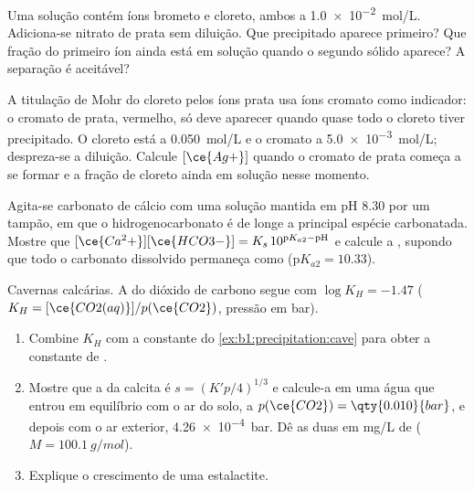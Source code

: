 \begin{exercise}[$\star\star$]\label{exo:b1:precipitation:7}
Uma solução contém íons brometo e cloreto, ambos a
\qty{1.0e-2}{mol/L}. Adiciona-se nitrato de prata sem diluição. Que
precipitado aparece primeiro? Que fração do primeiro íon ainda está em
solução quando o segundo sólido aparece? A separação é aceitável?
\end{exercise}

\begin{exercise}[$\star\star$]\label{exo:b1:precipitation:8}
A titulação de Mohr do cloreto pelos íons prata usa íons cromato como
indicador: o cromato de prata, vermelho, só deve aparecer quando quase
todo o cloreto tiver precipitado. O cloreto está a \qty{0.050}{mol/L} e
o cromato a \qty{5.0e-3}{mol/L}; despreza-se a diluição. Calcule
$[\ce{Ag+}]$ quando o cromato de prata começa a se formar e a fração de
cloreto ainda em solução nesse momento.
\end{exercise}

\begin{exercise}[$\star\star$]\label{exo:b1:precipitation:9}
Agita-se carbonato de cálcio com uma solução mantida em pH 8.30 por um
tampão, em que o hidrogenocarbonato é de longe a principal espécie
carbonatada. Mostre que
$[\ce{Ca^2+}][\ce{HCO3-}] = K_s\,10^{\mathrm{p}K_{a2} - \mathrm{pH}}$ e
calcule a , supondo que todo o carbonato dissolvido permaneça
como  ($\mathrm{p}K_{a2} = 10.33$).
\end{exercise}

\begin{exercise}[$\star\star\star$]\label{exo:b1:precipitation:10}
Cavernas calcárias. A  do dióxido de carbono segue
 com $\log K_H = -1.47$ ($K_H =
[\ce{CO2(aq)}]/p(\ce{CO2})$, pressão em bar).
\begin{enumerate}
  \item Combine $K_H$ com a constante do
        \cref{ex:b1:precipitation:cave} para obter a constante de
        .
  \item Mostre que a  da calcita é $s = (K'p/4)^{1/3}$ e
        calcule-a em uma água que entrou em equilíbrio com o ar do solo, a
        $p(\ce{CO2}) = \qty{0.010}{bar}$, e depois com o ar exterior,
        \qty{4.26e-4}{bar}. Dê as duas em \unit{mg/L} de 
        ($M = \qty{100.1}{g/mol}$).
  \item Explique o crescimento de uma estalactite.
\end{enumerate}
\end{exercise}

